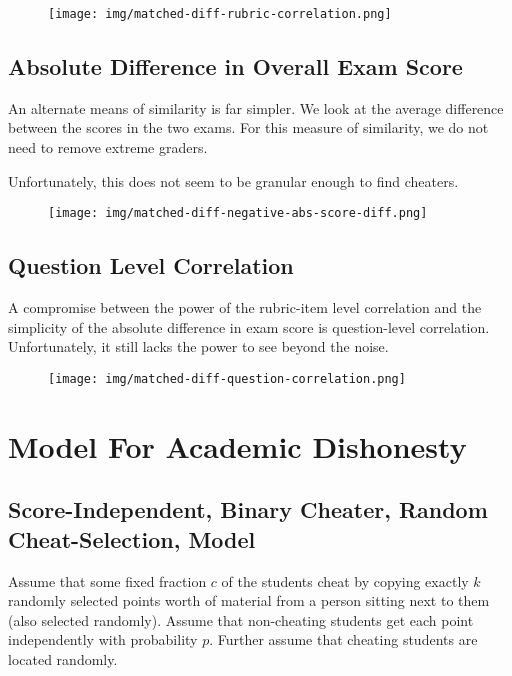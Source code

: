 \documentclass{article}
\begin{document}
        \begin{figure}[h!]
            \centering
            \texttt{[image: img/matched-diff-rubric-correlation.png]}
        \end{figure}
    \subsection{Absolute Difference in Overall Exam Score}
        An alternate means of similarity is far simpler. We look at the average difference
            between the scores in the two exams. For this measure of similarity, we do not need to
            remove extreme graders.

        Unfortunately, this does not seem to be granular enough to find cheaters.
        \begin{figure}[h!]
            \centering
            \texttt{[image: img/matched-diff-negative-abs-score-diff.png]}
        \end{figure}
    \subsection{Question Level Correlation}
        A compromise between the power of the rubric-item level correlation and the simplicity of
            the absolute difference in exam score is question-level correlation. Unfortunately, it
            still lacks the power to see beyond the noise.
        \begin{figure}[h!]
            \centering
            \texttt{[image: img/matched-diff-question-correlation.png]}
        \end{figure}
\section{Model For Academic Dishonesty}
    \subsection{Score-Independent, Binary Cheater, Random Cheat-Selection, Model}
        Assume that some fixed fraction $c$ of the students cheat by copying exactly $k$
            randomly selected points worth of material from a person sitting next to them (also
            selected randomly). Assume that non-cheating students get each point independently
            with probability $p$. Further assume that cheating students are located randomly.
\end{document}
